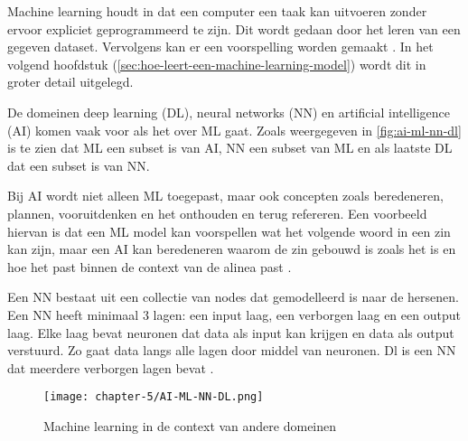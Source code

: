 
Machine learning houdt in dat een computer een taak kan uitvoeren zonder ervoor expliciet geprogrammeerd te zijn. Dit wordt gedaan door het leren van een gegeven dataset. Vervolgens kan er een voorspelling worden gemaakt \cite[p.~1-3]{introduction-to-machine-learning}. In het volgend hoofdstuk (\autoref{sec:hoe-leert-een-machine-learning-model}) wordt dit in groter detail uitgelegd.


De domeinen deep learning (DL), neural networks (NN) en artificial intelligence (AI) komen vaak voor als het over ML gaat. Zoals weergegeven in \autoref{fig:ai-ml-nn-dl} is te zien dat ML een subset is van AI, NN een subset van ML en als laatste DL dat een subset is van NN.

Bij AI wordt niet alleen ML toegepast, maar ook concepten zoals beredeneren, plannen, vooruitdenken en het onthouden en terug refereren. Een voorbeeld hiervan is dat een ML model kan voorspellen wat het volgende woord in een zin kan zijn, maar een AI kan beredeneren waarom de zin gebouwd is zoals het is en hoe het past binnen de context van de alinea past \cite{ml-think-about-ml-brownlee}.

Een NN bestaat uit een collectie van nodes dat gemodelleerd is naar de hersenen. Een NN heeft minimaal 3 lagen: een input laag, een verborgen laag en een output laag. Elke laag bevat neuronen dat data als input kan krijgen en data als output verstuurd. Zo gaat data langs alle lagen door middel van neuronen. Dl is een NN dat meerdere verborgen lagen bevat \cite{ml-neural-network-nicholson}.

\begin{figure}[hbt!]
  \centering
  \texttt{[image: chapter-5/AI-ML-NN-DL.png]}
  \caption{Machine learning in de context van andere domeinen}
  \label{fig:ai-ml-nn-dl}
\end{figure}



